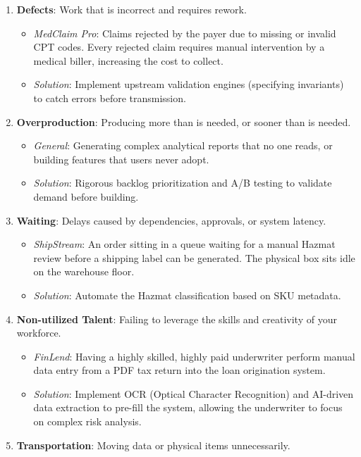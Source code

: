 \documentclass[
  11pt,
  openany,
  oneside]{book}
\providecommand{\tightlist}{%
  \setlength{\itemsep}{0pt}\setlength{\parskip}{0pt}}
\begin{document}
\begin{enumerate}
\def\labelenumi{\arabic{enumi}.}
\tightlist
\item
  \textbf{Defects}: Work that is incorrect and requires rework.

  \begin{itemize}
  \tightlist
  \item
    \emph{MedClaim Pro}: Claims rejected by the payer due to missing or
    invalid CPT codes. Every rejected claim requires manual intervention
    by a medical biller, increasing the cost to collect.
  \item
    \emph{Solution}: Implement upstream validation engines (specifying
    invariants) to catch errors before transmission.
  \end{itemize}
\item
  \textbf{Overproduction}: Producing more than is needed, or sooner than
  is needed.

  \begin{itemize}
  \tightlist
  \item
    \emph{General}: Generating complex analytical reports that no one
    reads, or building features that users never adopt.
  \item
    \emph{Solution}: Rigorous backlog prioritization and A/B testing to
    validate demand before building.
  \end{itemize}
\item
  \textbf{Waiting}: Delays caused by dependencies, approvals, or system
  latency.

  \begin{itemize}
  \tightlist
  \item
    \emph{ShipStream}: An order sitting in a queue waiting for a manual
    Hazmat review before a shipping label can be generated. The physical
    box sits idle on the warehouse floor.
  \item
    \emph{Solution}: Automate the Hazmat classification based on SKU
    metadata.
  \end{itemize}
\item
  \textbf{Non-utilized Talent}: Failing to leverage the skills and
  creativity of your workforce.

  \begin{itemize}
  \tightlist
  \item
    \emph{FinLend}: Having a highly skilled, highly paid underwriter
    perform manual data entry from a PDF tax return into the loan
    origination system.
  \item
    \emph{Solution}: Implement OCR (Optical Character Recognition) and
    AI-driven data extraction to pre-fill the system, allowing the
    underwriter to focus on complex risk analysis.
  \end{itemize}
\item
  \textbf{Transportation}: Moving data or physical items unnecessarily.


\end{enumerate}
\end{document}
